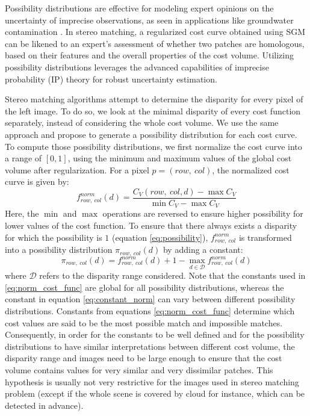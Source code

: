 Possibility distributions are effective for modeling expert opinions on the uncertainty of imprecise observations, as seen in applications like groundwater contamination \cite{bardossy_l-_1995, baudrit_joint_2007}. In stereo matching, a regularized cost curve obtained using SGM can be likened to an expert's assessment of whether two patches are homologous, based on their features and the overall properties of the cost volume. Utilizing possibility distributions leverages the advanced capabilities of imprecise probability (IP) theory for robust uncertainty estimation.

Stereo matching algorithms attempt to determine the disparity for every pixel of the left image. To do so, we look at the minimal disparity of every cost function separately, instead of considering the whole cost volume. We use the same approach and propose to generate a possibility distribution for each cost curve. To compute those possibility distributions, we first normalize the cost curve into a range of \([0,1]\), using the minimum and maximum values of the global cost volume after regularization. For a pixel \( p = (row,~col) \), the normalized cost curve is given by:
\begin{equation}
    f_{row,~col}^{norm}(d) = \frac{C_V(row,~col,d) - \max C_V}{\min C_V - \max C_V} \label{eq:norm_cost_func}
\end{equation}
Here, the \(\min\) and \(\max\) operations are reversed to ensure higher possibility for lower values of the cost function. To ensure that there always exists a disparity for which the possibility is $1$ (equation \ref{eq:possibility}), \( f_{row,~col}^{norm} \) is transformed into a possibility distribution \( \pi_{row,~col}(d) \) by adding a constant:
\begin{equation}
    \pi_{row,~col}(d) = f_{row,~col}^{norm}(d) + 1 - \max_{d \in \mathcal{D}} f_{row,~col}^{norm}(d) \label{eq:constant_norm}
\end{equation}
where \(\mathcal{D}\) refers to the disparity range considered. Note that the constants used in \ref{eq:norm_cost_func} are global for all possibility distributions, whereas the constant in equation \ref{eq:constant_norm} can vary between different possibility distributions. Constants from equations \ref{eq:norm_cost_func} determine which cost values are said to be the most possible match and impossible matches. Consequently, in order for the constants to be well defined and for the possibility distributions to have similar interpretations between different cost volume, the disparity range and images need to be large enough to ensure that the cost volume contains values for very similar and very dissimilar patches. This hypothesis is usually not very restrictive for the images used in stereo matching problem (except if the whole scene is covered by cloud for instance, which can be detected in advance).

